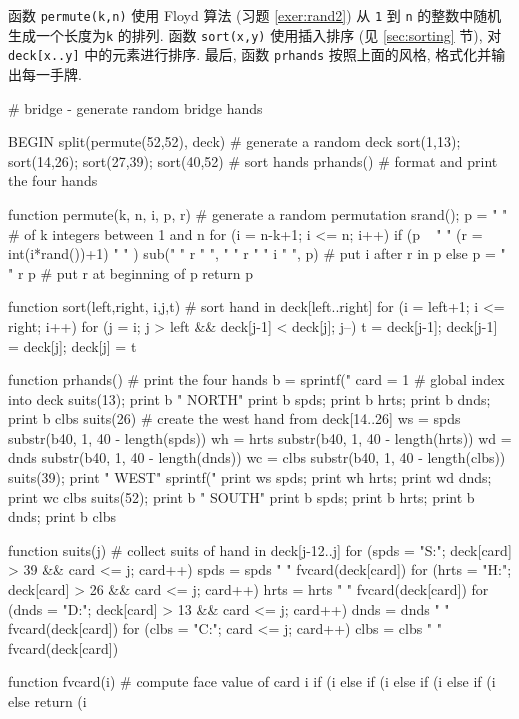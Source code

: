 函数 \texttt{permute(k,n)} 使用 Floyd 算法 (习题 \ref{exer:rand2}) 从
\texttt{1} 到 \texttt{n} 的整数中随机生成一个长度为\texttt{k} 的排列.
函数 \texttt{sort(x,y)} 使用插入排序 (见 \ref{sec:sorting} 节),
对 \texttt{deck[x..y]} 中的元素进行排序. 最后, 函数 \texttt{prhands} 
按照上面的风格, 格式化并输出每一手牌.
\begin{awkcode}
    # bridge - generate random bridge hands

    BEGIN { split(permute(52,52), deck)           # generate a random deck
            sort(1,13); sort(14,26); sort(27,39); sort(40,52) # sort hands
            prhands()                    # format and print the four hands
    }

    function permute(k, n,    i, p, r) {   # generate a random permutation
        srand(); p = " "                   # of k integers between 1 and n
        for (i = n-k+1; i <= n; i++)
            if (p ~ " " (r = int(i*rand())+1) " " )
                sub(" " r " ", " " r " " i " ", p)    # put i after r in p
            else p = " " r p                     # put r at beginning of p
        return p
    }

    function sort(left,right,    i,j,t) { # sort hand in deck[left..right]
        for (i = left+1; i <= right; i++)
            for (j = i; j > left && deck[j-1] < deck[j]; j--) {
                t = deck[j-1]; deck[j-1] = deck[j]; deck[j] = t
            }
    }

    function prhands() {                            # print the four hands
        b = sprintf("%
        card = 1                                  # global index into deck
        suits(13); print b "   NORTH"
        print b spds; print b hrts; print b dnds; print b clbs
        suits(26)  # create the west hand from deck[14..26]
        ws = spds substr(b40, 1, 40 - length(spds))
        wh = hrts substr(b40, 1, 40 - length(hrts))
        wd = dnds substr(b40, 1, 40 - length(dnds))
        wc = clbs substr(b40, 1, 40 - length(clbs))
        suits(39); print "   WEST" sprintf("%
        print ws spds; print wh hrts; print wd dnds; print wc clbs
        suits(52); print b "   SOUTH"
        print b spds; print b hrts; print b dnds; print b clbs
    }

    function suits(j) {           # collect suits of hand in deck[j-12..j]
        for (spds = "S:"; deck[card] > 39 && card <= j; card++)
            spds = spds " " fvcard(deck[card])
        for (hrts = "H:"; deck[card] > 26 && card <= j; card++)
            hrts = hrts " " fvcard(deck[card])
        for (dnds = "D:"; deck[card] > 13 && card <= j; card++)
            dnds = dnds " " fvcard(deck[card])
        for (clbs = "C:"; card <= j; card++)
            clbs = clbs " " fvcard(deck[card])
    }

    function fvcard(i) {                    # compute face value of card i
        if (i %
        else if (i %
        else if (i %
        else if (i %
        else return (i %
    }
\end{awkcode}

